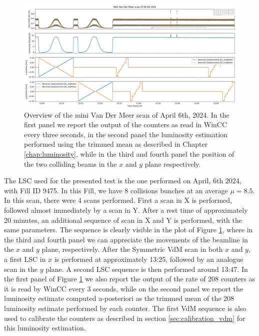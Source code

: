 \begin{figure}
    \centering
    \includegraphics[width=\textwidth]{figures/lumi_with_counters.png}
    \caption{Overview of the mini Van Der Meer scan of April 6th, 2024. In the first panel we report the output of the counters as read in WinCC every three seconds, in the second panel the luminosity estimation performed using the trimmed mean as described in Chapter \ref{chap:luminosity}, while in the third and fourth panel the position of the two colliding beams in the $x$ and $y$ plane respectively.}
    \label{fig:mini-vdm}
\end{figure}

The LSC used for the presented test is the one performed on April, 6th 2024, with Fill ID 9475. In this Fill, we have 8 collisions bunches at an average $\mu=8.5$. In this scan, there were 4 scans performed. First a scan in X is performed, followed almost immediately by a scan in Y. After a rest time of approximately 20 minutes, an additional sequence of scan in X and Y is performed, with the same parameters. The sequence is clearly visible in the plot of Figure \ref{fig:mini-vdm}, where in the third and fourth panel we can appreciate the movements of the beamline in the $x$ and $y$ plane, respectively. After the Symmetric VdM scan in both $x$ and $y$, a first LSC in $x$ is performed at approximately 13:25, followed by an analogue scan in the $y$ plane. A second LSC sequence is then performed around 13:47. In the first panel of Figure \ref{fig:mini-vdm} we also report the output of the rate of 208 counters as it is read by WinCC every 3 seconds, while on the second panel we report the luminosity estimate computed a-posteriori as the trimmed mean of the 208 luminosity estimate performed by each counter. The first VdM sequence is also used to calibrate the counters as described in section \ref{sec:calibration_vdm} for this luminosity estimation. 

